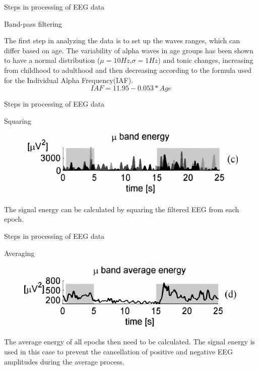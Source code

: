 \documentclass{beamer}
\begin{document}
\begin{frame}
{\centerline{Steps in processing of EEG data}}
{\centerline{Band-pass filtering}}
The first step in analyzing the data is to set up the waves ranges, which can differ based on age. The variability of alpha waves in age groups has been shown to have a normal distribution ($\mu=10Hz$,$\sigma=1Hz$) and tonic changes, increasing from childhood to adulthood and then decreasing according to the formula used for the Individual Alpha Frequency(IAF).
$$IAF=11.95 - 0.053 * Age$$
\end{frame}

\begin{frame}
{\centerline{Steps in processing of EEG data}}
{\centerline{Squaring}}
    \begin{figure}
        \centering
        \includegraphics[width=\linewidth]{P2023.AIBCCSS.BrainSignals/squaring.jpg}
    \end{figure}
    The signal energy can be calculated by squaring the filtered EEG from each epoch.
\end{frame}

\begin{frame}
{\centerline{Steps in processing of EEG data}}
{\centerline{Averaging}}
\begin{figure}
    \centering
    \includegraphics[width=\linewidth]{P2023.AIBCCSS.BrainSignals/averaging.jpg}
\end{figure}
    The average energy of all epochs then need to be calculated. The signal energy is used in this case to prevent the cancellation of positive and negative EEG amplitudes during the average process.
\end{frame}
\end{document}
